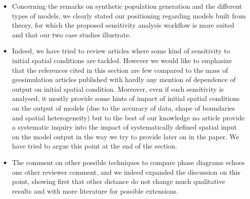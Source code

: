 \documentclass[11pt,a4paper,sans]{moderncv}        %
\begin{document}
\begin{itemize}
	\item Concerning the remarks on synthetic population generation and the different types of models, we clearly stated our positioning regarding models built from theory, for which the proposed sensitivity analysis workflow is more suited and that our two case studies illustrate.
	
	\item Indeed, we have tried to review articles where some kind of sensitivity to initial spatial conditions are tackled. However we would like to emphasize that the references cited in this section are few compared to the mass of geosimulation articles published with hardly any mention of dependence of output on initial spatial condition. Moreover, even if such sensitivity is analysed, it mostly provide some hints of impact of initial spatial conditions on the output of models (due to the accuracy of data, shape of boundaries and spatial heterogeneity) but to the best of our knowledge no article provide a systematic inquiry into the impact of systematically defined spatial input on the model output in the way we try to provide later on in the paper. We have tried to argue this point at the end of the section.
	
	\item The comment on other possible techniques to compare phase diagrams echoes one other reviewer comment, and we indeed expanded the discussion on this point, showing first that other distance do not change much qualitative results and with more literature for possible extensions.
	

\end{itemize}
\end{document}
